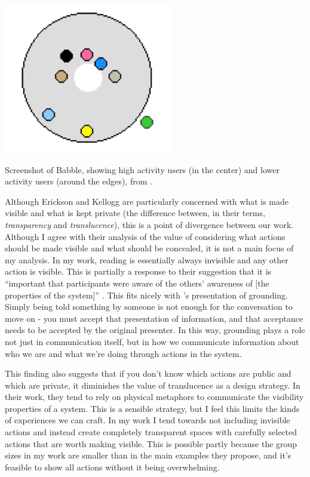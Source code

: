 \begin{marginfigure}
	\includegraphics{figures/babble.png}
	\caption{Screenshot of Babble, showing high activity users (in the center) and lower activity users (around the edges), from \citep{Erickson:2003td}.}
	\label{fig:proxy-babble}
\end{marginfigure}

Although Erickson and Kellogg are particularly concerned with what is made visible and what is kept private (the difference between, in their terms, \emph{transparency} and \emph{translucence}), this is a point of divergence between our work. Although I agree with their analysis of the value of considering what actions should be made visible and what should be concealed, it is not a main focus of my analysis. In my work, reading is essentially always invisible and any other action is visible. This is partially a response to their suggestion that it is ``important that participants were aware of the others' awareness of [the properties of the system]'' \citep{Erickson:2003td}. This fits nicely with \citet{Brennan:1991wk}'s presentation of grounding. Simply being told something by someone is not enough for the conversation to move on - you must accept that presentation of information, and that acceptance needs to be accepted by the original presenter. In this way, grounding plays a role not just in communication itself, but in how we communicate information about who we are and what we're doing through actions in the system. 

This finding also suggests that if you don't know which actions are public and which are private, it diminishes the value of translucence as a design strategy. In their work, they tend to rely on physical metaphors to communicate the visibility properties of a system. This is a sensible strategy, but I feel this limits the kinds of experiences we can craft. In my work I tend towards not including invisible actions and instead create completely transparent spaces with carefully selected actions that are worth making visible. This is possible partly because the group sizes in my work are smaller than in the main examples they propose, and it's feasible to show all actions without it being overwhelming. 

